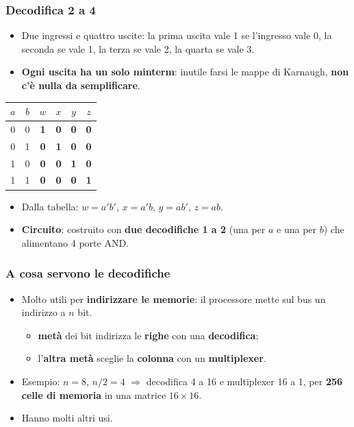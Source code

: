 \documentclass[12pt, a4paper]{article}
\begin{document}
\subsubsection{Decodifica 2 a 4}
\begin{itemize}
    \item Due ingressi e quattro uscite: la prima uscita vale 1 se l'ingresso vale 0, la seconda se vale 1, la terza se vale 2, la quarta se vale 3.
    \item \textbf{Ogni uscita ha un solo minterm}: inutile farsi le mappe di Karnaugh, \textbf{non c'è nulla da semplificare}.
\end{itemize}

\begin{center}
\renewcommand{\arraystretch}{1.25}
\begin{tabular}[t]{|cc||cccc|}
\hline
\colorbox{gray!25}{\color{black}$a$} & \colorbox{gray!25}{\color{black}$b$} & \colorbox{gray!25}{\color{black}$w$} & \colorbox{gray!25}{\color{black}$x$} & \colorbox{gray!25}{\color{black}$y$} & \colorbox{gray!25}{\color{black}$z$} \\ \hline
0 & 0 & \textbf{1} & \textbf{0} & \textbf{0} & \textbf{0} \\ \hline
0 & 1 & \textbf{0} & \textbf{1} & \textbf{0} & \textbf{0} \\ \hline
1 & 0 & \textbf{0} & \textbf{0} & \textbf{1} & \textbf{0} \\ \hline
1 & 1 & \textbf{0} & \textbf{0} & \textbf{0} & \textbf{1} \\ \hline
\end{tabular}
\end{center}

\begin{itemize}
    \item Dalla tabella: $w = a'b'$, \quad $x = a'b$, \quad $y = ab'$, \quad $z = ab$.
    \item \textbf{Circuito}: costruito con \textbf{due decodifiche 1 a 2} (una per $a$ e una per $b$) che alimentano 4 porte AND.
\end{itemize}

\subsubsection{A cosa servono le decodifiche}
\begin{itemize}
    \item Molto utili per \textbf{indirizzare le memorie}: il processore mette sul bus un indirizzo a $n$ bit.
    \begin{itemize}
        \item \textbf{metà} dei bit indirizza le \textbf{righe} con una \textbf{decodifica};
        \item l'\textbf{altra metà} sceglie la \textbf{colonna} con un \textbf{multiplexer}.
    \end{itemize}
    \item Esempio: $n = 8$, $n/2 = 4$ $\Rightarrow$ decodifica 4 a 16 e multiplexer 16 a 1, per \textbf{256 celle di memoria} in una matrice $16 \times 16$.
    \item Hanno molti altri usi.
\end{itemize}
\end{document}
